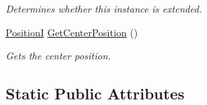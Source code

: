 \begin{DoxyCompactItemize}
\begin{DoxyCompactList}\small\item\em Determines whether this instance is extended. \end{DoxyCompactList}\item 
\hyperlink{classCore_1_1Models_1_1PositionI}{Position\+I} \hyperlink{classClient_1_1Common_1_1Views_1_1MenuView_a962b8d352d3efcb71d529cc8234f63a4}{Get\+Center\+Position} ()
\begin{DoxyCompactList}\small\item\em Gets the center position. \end{DoxyCompactList}\end{DoxyCompactItemize}
\subsection*{Static Public Attributes}
